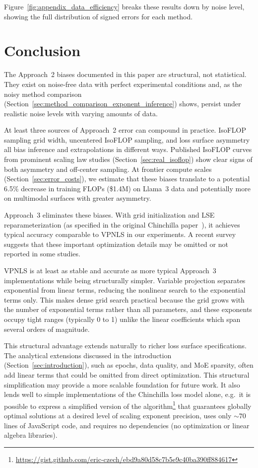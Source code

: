 \documentclass[11pt]{article}
\begin{document}
Figure~\ref{fig:appendix_data_efficiency} breaks these results down by noise
level, showing the full distribution of signed errors for each method.

\section{Conclusion}
\label{sec:conclusion}

The Approach~2 biases documented in this paper are structural, not statistical.
They exist on noise-free data with perfect experimental conditions and, as the
noisy method comparison (Section~\ref{sec:method_comparison_exponent_inference})
shows, persist under realistic noise levels with varying amounts of data.

At least three sources of Approach~2 error can compound in practice. IsoFLOP
sampling grid width, uncentered IsoFLOP sampling, and loss surface asymmetry
all bias inference and extrapolations in different ways. Published IsoFLOP
curves from prominent scaling law studies
(Section~\ref{sec:real_isoflop}) show clear signs of both asymmetry and
off-center sampling. At frontier compute scales
(Section~\ref{sec:error_costs}), we estimate that these biases translate to a
potential 6.5\% decrease in training FLOPs (\$1.4M) on Llama~3 data
and potentially more on multimodal surfaces with greater asymmetry.

Approach~3 eliminates these biases. With grid initialization and LSE
reparameterization (as specified in the original Chinchilla
paper~\citep{chinchilla}), it achieves typical accuracy comparable to VPNLS in
our experiments. A recent survey~\citep{misfitting} suggests that these
important optimization details may be omitted or not reported in some studies.

VPNLS is at least as stable and accurate as more typical Approach~3
implementations while being structurally simpler. Variable projection separates
exponential from linear terms, reducing the nonlinear search to the exponential
terms only. This makes dense grid search practical because the grid grows with
the number of exponential terms rather than all parameters, and these exponents
occupy tight ranges (typically 0 to 1) unlike the linear coefficients which
span several orders of magnitude.

This structural advantage extends naturally to richer loss surface
specifications. The analytical extensions discussed in the introduction
(Section~\ref{sec:introduction}), such as epochs, data quality, and MoE
sparsity, often add linear terms that could be omitted from direct
optimization. This structural simplification may provide a more scalable
foundation for future work. It also lends well to simple implementations of
the Chinchilla loss model alone, e.g.\ it is possible to express a simplified
version of the algorithm\footnote{\url{https://gist.github.com/eric-czech/ebd9a80d58c7b5e9c40ba390ff884617}}
that guarantees globally optimal solutions at a desired level of scaling
exponent precision, uses only ${\sim}70$ lines of JavaScript code, and
requires no dependencies (no optimization or linear algebra libraries).
\end{document}
